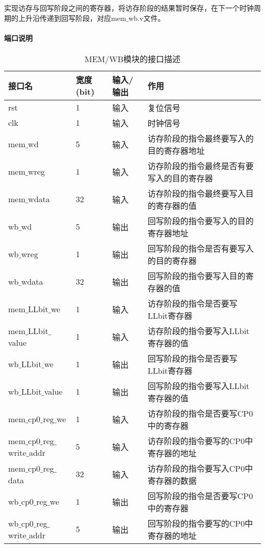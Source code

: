 \quad

实现访存与回写阶段之间的寄存器，将访存阶段的结果暂时保存，在下一个时钟周期的上升沿传递到回写阶段，对应mem$\_$wb.v文件。
\paragraph{端口说明}
\quad

\quad
\begin{table}[H]
	\centering
	\caption{MEM/WB模块的接口描述}
	\begin{tabular}{|l|l|l|l|}
		\hline
		接口名 & 宽度(bit) & 输入/输出 & 作用 \\
		\hline
		rst & 1 & 输入 & 复位信号 \\
		\hline
		clk & 1 & 输入 & 时钟信号 \\
		\hline
		mem$\_$wd & 5 & 输入 & 访存阶段的指令最终要写入的目的寄存器地址 \\
		\hline
		mem$\_$wreg & 1 & 输入 & 访存阶段的指令最终是否有要写入的目的寄存器 \\
		\hline
		mem$\_$wdata & 32 & 输入 & 访存阶段的指令最终要写入目的寄存器的值 \\
		\hline
		wb$\_$wd & 5 & 输出 & 回写阶段的指令要写入的目的寄存器地址 \\
		\hline
		wb$\_$wreg & 1 & 输出 & 回写阶段的指令是否有要写入的目的寄存器 \\
		\hline
		wb$\_$wdata & 32 & 输出 & 回写阶段的指令要写入目的寄存器的值 \\
		\hline
		mem$\_$LLbit$\_$we & 1 & 输入 & 访存阶段的指令是否要写LLbit寄存器 \\
		\hline
		mem$\_$LLbit$\_$value & 1 & 输入 & 访存阶段的指令要写入LLbit寄存器的值 \\
		\hline
		wb$\_$LLbit$\_$we & 1 & 输出 & 回写阶段的指令是否要写LLbit寄存器 \\
		\hline
		wb$\_$LLbit$\_$value & 1 & 输出 & 回写阶段的指令要写入LLbit寄存器的值 \\
		\hline
		mem$\_$cp0$\_$reg$\_$we & 1 & 输入 & 访存阶段的指令是否要写CP0中的寄存器 \\
		\hline
		mem$\_$cp0$\_$reg$\_$write$\_$addr & 5 & 输入 & 访存阶段的指令要写的CP0中寄存器的地址 \\
		\hline
		mem$\_$cp0$\_$reg$\_$data & 32 & 输入 & 访存阶段的指令要写入CP0中寄存器的数据 \\
		\hline
		wb$\_$cp0$\_$reg$\_$we & 1 & 输出 & 回写阶段的指令是否要写CP0中的寄存器 \\
		\hline
		wb$\_$cp0$\_$reg$\_$write$\_$addr & 5 & 输出 & 回写阶段的指令要写的CP0中寄存器的地址 \\

\end{tabular}
\end{table}
